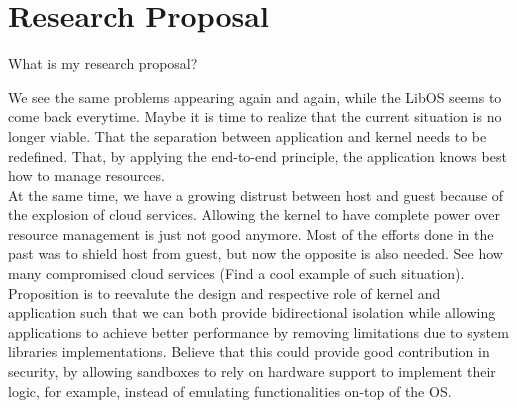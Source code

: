 \section{Research Proposal}

What is my research proposal?

We see the same problems appearing again and again, while the LibOS seems to come back everytime.
Maybe it is time to realize that the current situation is no longer viable.
That the separation between application and kernel needs to be redefined.
That, by applying the end-to-end principle, the application knows best how to manage resources.\\

At the same time, we have a growing distrust between host and guest because of the explosion of cloud services.
Allowing the kernel to have complete power over resource management is just not good anymore.
Most of the efforts done in the past was to shield host from guest, but now the opposite is also needed.
See how many compromised cloud services (Find a cool example of such situation).\\

Proposition is to reevalute the design and respective role of kernel and application such that we can both provide bidirectional isolation while allowing applications to achieve better performance by removing limitations due to system libraries implementations.
Believe that this could provide good contribution in security, by allowing sandboxes to rely on hardware support to implement their logic, for example, instead of emulating functionalities on-top of the OS.